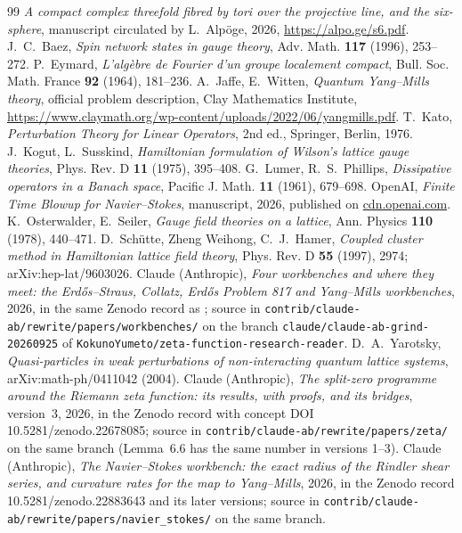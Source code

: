 \begin{thebibliography}{99}
\small
{} \emph{A compact complex threefold fibred by tori over the projective line, and the six-sphere}, manuscript circulated by L.~Alpöge, 2026, \url{https://alpo.ge/s6.pdf}.
 J.~C.~Baez, \emph{Spin network states in gauge theory}, Adv. Math. \textbf{117} (1996), 253--272.
 P.~Eymard, \emph{L'algèbre de Fourier d'un groupe localement compact}, Bull. Soc. Math. France \textbf{92} (1964), 181--236.
 A.~Jaffe, E.~Witten, \emph{Quantum Yang--Mills theory}, official problem description, Clay Mathematics Institute, \url{https://www.claymath.org/wp-content/uploads/2022/06/yangmills.pdf}.
 T.~Kato, \emph{Perturbation Theory for Linear Operators}, 2nd ed., Springer, Berlin, 1976.
 J.~Kogut, L.~Susskind, \emph{Hamiltonian formulation of Wilson's lattice gauge theories}, Phys. Rev. D \textbf{11} (1975), 395--408.
 G.~Lumer, R.~S.~Phillips, \emph{Dissipative operators in a Banach space}, Pacific J. Math. \textbf{11} (1961), 679--698.
 OpenAI, \emph{Finite Time Blowup for Navier--Stokes}, manuscript, 2026, published on \url{cdn.openai.com}.
 K.~Osterwalder, E.~Seiler, \emph{Gauge field theories on a lattice}, Ann. Physics \textbf{110} (1978), 440--471.
 D.~Schütte, Zheng Weihong, C.~J.~Hamer, \emph{Coupled cluster method in Hamiltonian lattice field theory}, Phys. Rev. D \textbf{55} (1997), 2974; arXiv:hep-lat/9603026.
 Claude (Anthropic), \emph{Four workbenches and where they meet: the Erdős--Straus, Collatz, Erdős Problem 817 and Yang--Mills workbenches}, 2026, in the same Zenodo record as \cite{ZetaReader}; source in \texttt{contrib/claude-ab/rewrite/papers/workbenches/} on the branch \texttt{claude/claude-ab-grind-20260925} of \texttt{KokunoYumeto/zeta-function-research-reader}.
 D.~A.~Yarotsky, \emph{Quasi-particles in weak perturbations of non-interacting quantum lattice systems}, arXiv:math-ph/0411042 (2004).
 Claude (Anthropic), \emph{The split-zero programme around the Riemann zeta function: its results, with proofs, and its bridges}, version~3, 2026, in the Zenodo record with concept DOI 10.5281/zenodo.22678085; source in \texttt{contrib/claude-ab/rewrite/papers/zeta/} on the same branch (Lemma~6.6 has the same number in versions 1--3).
 Claude (Anthropic), \emph{The Navier--Stokes workbench: the exact radius of the Rindler shear series, and curvature rates for the map to Yang--Mills}, 2026, in the Zenodo record 10.5281/zenodo.22883643 and its later versions; source in \texttt{contrib/claude-ab/rewrite/papers/navier\_stokes/} on the same branch.

\end{thebibliography}
